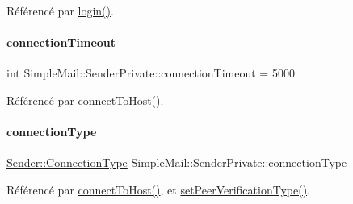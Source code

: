 Référencé par \hyperlink{class_simple_mail_1_1_sender_private_a927e5c262ee89fb335410ebec020091d}{login()}.

\mbox{\label{class_simple_mail_1_1_sender_private_a9328b6f8c9df4ce6e8517ec713f42421}} 
\paragraph{\texorpdfstring{connection\+Timeout}{connectionTimeout}}
{\footnotesize\ttfamily int Simple\+Mail\+::\+Sender\+Private\+::connection\+Timeout = 5000}



Référencé par \hyperlink{class_simple_mail_1_1_sender_private_aa2f9a37cfe58c3e39afa75e79070cee1}{connect\+To\+Host()}.

\mbox{\label{class_simple_mail_1_1_sender_private_a2d09eb5d137213e97f10228f8ed68134}} 
\paragraph{\texorpdfstring{connection\+Type}{connectionType}}
{\footnotesize\ttfamily \hyperlink{class_simple_mail_1_1_sender_a89e6a9572b306441237f6b6635729d1a}{Sender\+::\+Connection\+Type} Simple\+Mail\+::\+Sender\+Private\+::connection\+Type}



Référencé par \hyperlink{class_simple_mail_1_1_sender_private_aa2f9a37cfe58c3e39afa75e79070cee1}{connect\+To\+Host()}, et \hyperlink{class_simple_mail_1_1_sender_private_aea040b22ce411e03111080e7546f91c0}{set\+Peer\+Verification\+Type()}.

\mbox{\label{class_simple_mail_1_1_sender_private_a90e5dacf8918960f7f1ac89d476c00a2}} 
